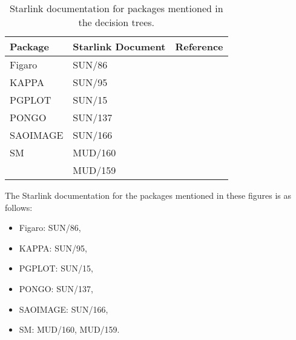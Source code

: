 \documentclass[twoside,11pt]{article}
\newenvironment{latexonly}{}{}
\newcommand{\xref}[3]{#1}
\begin{document}

\begin{latexonly}
\begin{table}[htbp]

\begin{center}
\begin{tabular}{llc}
Package      & Starlink Document &  Reference \\ \hline
Figaro       & SUN/86   & \cite{FIGARO}   \\
KAPPA        & SUN/95   & \cite{KAPPA}    \\
PGPLOT       & SUN/15   & \cite{PGPLOT}   \\
PONGO        & SUN/137  & \cite{PONGO}    \\
SAOIMAGE     & SUN/166  & \cite{SAOIMAGE} \\
SM           & MUD/160  & \cite{MUD160}   \\
             & MUD/159  & \cite{MUD159}   \\
\end{tabular}
\end{center}

\caption[Starlink documentation for packages mentioned in the decision
trees.]{Starlink documentation for packages mentioned in the decision
trees. \label{STARDOC} }

\end{table}
\end{latexonly}

\begin{htmlonly}

The Starlink documentation for the packages mentioned in these figures
is as follows:


\begin{itemize}

  \item \xref{Figaro}{sun86}{}:    SUN/86\cite{FIGARO},
  \item \xref{KAPPA}{sun95}{}:     SUN/95\cite{KAPPA},
  \item \xref{PGPLOT}{sun15}{}:    SUN/15\cite{PGPLOT},
  \item \xref{PONGO}{sun137}{}:    SUN/137\cite{PONGO},
  \item \xref{SAOIMAGE}{sun166}{}: SUN/166\cite{SAOIMAGE},
  \item SM: MUD/160\cite{MUD160},  MUD/159\cite{MUD159}.

\end{itemize}

\end{htmlonly}
\end{document}
